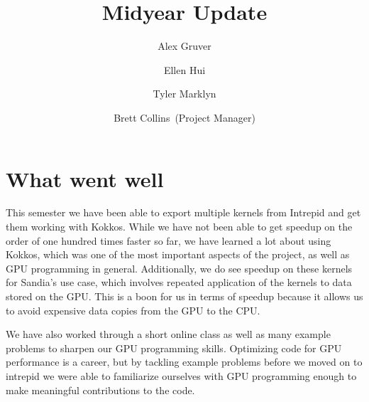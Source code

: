 \documentclass{hmcclinic}
\title{Midyear Update}
\author{Alex Gruver \and Ellen Hui \and Tyler Marklyn \and Brett Collins~(Project Manager)}
\begin{document}





\maketitle

\mainmatter




\section*{What went well}
This semester we have been able to export multiple kernels from Intrepid and 
get them working with Kokkos. While we have not been able to get speedup
on the order of one hundred times faster so far, we have learned a lot about
using Kokkos, which was one of the most important aspects of the project, as well
as GPU programming in general. Additionally, we do see speedup on these
kernels for Sandia's use case, which involves repeated application of the kernels
to data stored on the GPU. This is a boon for us in terms of speedup because it 
allows us to avoid expensive data copies from the GPU to the CPU.

We have also worked through a short online class as well as many example 
problems to sharpen our GPU programming skills. Optimizing code for GPU performance
is a career, but by tackling example problems before we moved on to intrepid
we were able to familiarize ourselves with GPU programming enough to make meaningful 
contributions to the code.
\end{document}
